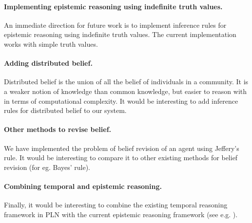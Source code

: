 \documentclass[12pt]{article}
\begin{document}
\paragraph{Implementing epistemic reasoning using indefinite truth values.} An immediate direction for future work is to implement inference rules for epistemic reasoning using indefinite truth values. The current implementation works with simple truth values.


\paragraph{Adding distributed belief.} Distributed belief is the union of all the belief of individuals in a community. It is a weaker notion of knowledge than common knowledge, but easier to reason with in terms of computational complexity. It would be interesting to add inference rules for distributed belief to our system.


\paragraph{Other methods to revise belief.} We have implemented the problem of belief revision of an agent using Jeffery's rule. It would be interesting to compare it to other existing methods for belief revision  (for eg. Bayes' rule). 

\paragraph{Combining temporal and epistemic reasoning.} Finally, it would be interesting to combine the existing temporal reasoning framework in PLN with the current epistemic reasoning framework (see e.g. \cite{Hoekwooldridge}). 

\paragraph{}




\end{document}
